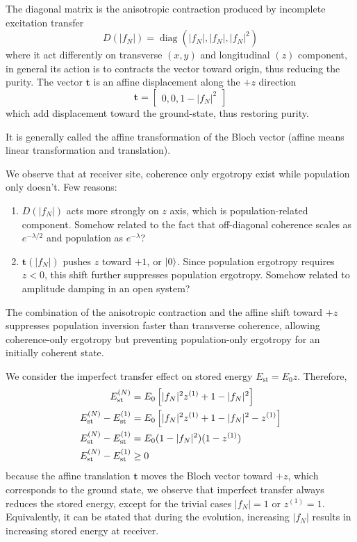 \documentclass[../../../main.tex]{subfiles}
\begin{document}
The diagonal matrix is the anisotropic contraction produced by incomplete excitation transfer
\begin{equation*}
  D(|f_N|) = \operatorname{diag}(|f_N|,|f_N|,|f_N|^2)
\end{equation*}
where it act differently on transverse $(x,y)$ and longitudinal $(z)$ component, in general its action is to contracts the vector toward origin, thus reducing the purity.
The vector $\textbf{t}$ is an affine displacement along the \(+z\) direction
\begin{equation*}
  \textbf{t} = \begin{bmatrix} 0, 0,1-|f_N|^2 \end{bmatrix}
\end{equation*}
which add displacement toward the ground-state, thus restoring purity.

It is generally called the affine transformation of the Bloch vector (affine means linear transformation and translation).

We observe that at receiver site, coherence only ergotropy exist while population only doesn't.
Few reasons:
\begin{enumerate}
  \item $D(|f_N|)$ acts more strongly on $z$ axis, which is population-related component.
        Somehow related to the fact that off-diagonal coherence scales as $e^{-\lambda/2}$ and population as $e^{-\lambda}$?
  \item $\mathbf{t}(|f_N|)$ pushes \(z\) toward \(+1\), or $\ket{0}$.
        Since population ergotropy requires \(z<0\), this shift further suppresses population ergotropy.
        Somehow related to amplitude damping in an open system?
\end{enumerate}
The combination of the anisotropic contraction and the affine shift toward \(+z\) suppresses population inversion faster than transverse coherence, allowing coherence-only ergotropy but preventing population-only ergotropy for an initially coherent state.

We consider the imperfect transfer effect on stored energy $E_\mathrm{st} = E_0z$.
Therefore,
\begin{align*}
  E_{\rm st}^{(N)}
   & =  E_0 \left[ |f_N|^2z^{(1)} + 1-|f_N|^2 \right]       \\
  E_{\rm st}^{(N)}-E_{\rm st}^{(1)}
   & = E_0 \left[ |f_N|^2z^{(1)} +1-|f_N|^2-z^{(1)} \right] \\
  E_{\rm st}^{(N)}-E_{\rm st}^{(1)}
   & = E_0(1-|f_N|^2)(1-z^{(1)})\\
    E_{\rm st}^{(N)}-E_{\rm st}^{(1)} &\geq 0
\end{align*}
because the affine translation $\mathbf{t}$ moves the Bloch vector toward \(+z\), which corresponds to the ground state, we observe that  imperfect transfer always reduces the stored energy, except for the trivial cases \( |f_N|=1\) or \(z^{(1)}=1\).
Equivalently, it can be stated that during the evolution, increasing $|f_N|$ results in increasing  stored energy at receiver.
\end{document}
